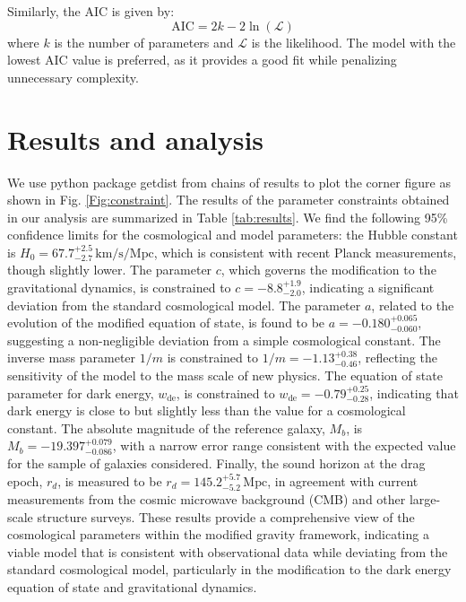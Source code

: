 \documentclass[a4paper,fleqn]{cas-sc}
\begin{document}
Similarly, the AIC is given by:
\begin{equation}
\text{AIC} = 2k - 2 \ln(\mathcal{L})
\end{equation}
where $k$ is the number of parameters and $\mathcal{L}$ is the likelihood. The model with the lowest AIC value is preferred, as it provides a good fit while penalizing unnecessary complexity.



\section{Results and analysis}\label{sec:result}

We use python package getdist \cite{Lewis:2019xzd} from chains of results to plot the corner figure as shown in Fig. \ref{Fig:constraint}. The results of the parameter constraints obtained in our analysis are summarized in Table \ref{tab:results}. We find the following 95\% confidence limits for the cosmological and model parameters: the Hubble constant is $ H_0 = 67.7^{+2.5}_{-2.7} \, \text{km/s/Mpc} $, which is consistent with recent Planck measurements, though slightly lower. The parameter $ c $, which governs the modification to the gravitational dynamics, is constrained to $ c = -8.8^{+1.9}_{-2.0} $, indicating a significant deviation from the standard cosmological model. The parameter $ a $, related to the evolution of the modified equation of state, is found to be $ a = -0.180^{+0.065}_{-0.060} $, suggesting a non-negligible deviation from a simple cosmological constant. The inverse mass parameter $ 1/m $ is constrained to $ 1/m = -1.13^{+0.38}_{-0.46} $, reflecting the sensitivity of the model to the mass scale of new physics. The equation of state parameter for dark energy, $ w_{\text{de}} $, is constrained to $ w_{\text{de}} = -0.79^{+0.25}_{-0.28} $, indicating that dark energy is close to but slightly less than the value for a cosmological constant. The absolute magnitude of the reference galaxy, $ M_b $, is $ M_b = -19.397^{+0.079}_{-0.086} $, with a narrow error range consistent with the expected value for the sample of galaxies considered. Finally, the sound horizon at the drag epoch, $ r_d $, is measured to be $ r_d = 145.2^{+5.7}_{-5.2} \, \text{Mpc} $, in agreement with current measurements from the cosmic microwave background (CMB) and other large-scale structure surveys. These results provide a comprehensive view of the cosmological parameters within the modified gravity framework, indicating a viable model that is consistent with observational data while deviating from the standard cosmological model, particularly in the modification to the dark energy equation of state and gravitational dynamics.
\end{document}
